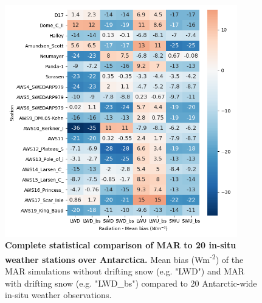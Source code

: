 \documentclass[draft,grl]{agutexSI2019}
\begin{document}
\clearpage
\begin{figure}[H]
	\includegraphics[width=0.9\textwidth]{heatmap_all_mb_new.png}
	\caption{\textbf{Complete statistical comparison of MAR to 20 in-situ weather stations over Antarctica.} Mean bias (Wm\textsuperscript{-2}) of the MAR simulations without drifting snow (e.g. "LWD") and MAR with drifting snow (e.g. "LWD\_bs") compared to 20 Antarctic-wide in-situ weather observations.}
	\label{fig:heat_all}
\end{figure}
\end{document}
